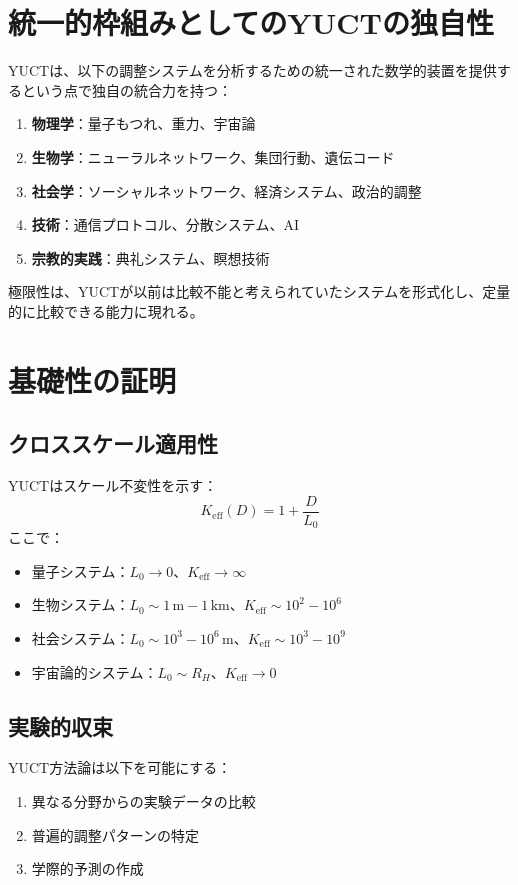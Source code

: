 \documentclass[12pt,a4paper]{article}
\begin{document}
	\section{統一的枠組みとしてのYUCTの独自性}
	
	YUCTは、以下の調整システムを分析するための統一された数学的装置を提供するという点で独自の統合力を持つ：
	\begin{enumerate}
		\item \textbf{物理学}：量子もつれ、重力、宇宙論
		\item \textbf{生物学}：ニューラルネットワーク、集団行動、遺伝コード
		\item \textbf{社会学}：ソーシャルネットワーク、経済システム、政治的調整
		\item \textbf{技術}：通信プロトコル、分散システム、AI
		\item \textbf{宗教的実践}：典礼システム、瞑想技術
	\end{enumerate}
	
	極限性は、YUCTが以前は比較不能と考えられていたシステムを形式化し、定量的に比較できる能力に現れる。
	
	\section{基礎性の証明}
	
	\subsection{クロススケール適用性}
	
	YUCTはスケール不変性を示す：
	\[
	K_{\mathrm{eff}}(D) = 1 + \frac{D}{L_0}
	\]
	ここで：
	\begin{itemize}
		\item 量子システム：$L_0 \to 0$、$K_{\mathrm{eff}} \to \infty$
		\item 生物システム：$L_0 \sim 1\,\mathrm{m}-1\,\mathrm{km}$、$K_{\mathrm{eff}} \sim 10^2-10^6$
		\item 社会システム：$L_0 \sim 10^3-10^6\,\mathrm{m}$、$K_{\mathrm{eff}} \sim 10^3-10^9$
		\item 宇宙論的システム：$L_0 \sim R_H$、$K_{\mathrm{eff}} \to 0$
	\end{itemize}
	
	\subsection{実験的収束}
	
	YUCT方法論は以下を可能にする：
	\begin{enumerate}
		\item 異なる分野からの実験データの比較
		\item 普遍的調整パターンの特定
		\item 学際的予測の作成
	\end{enumerate}
	
\end{document}

